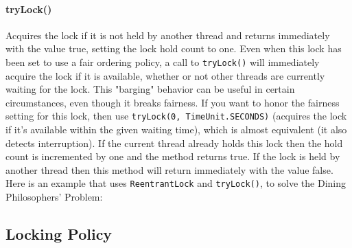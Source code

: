 \documentclass{article}
\begin{document}
\paragraph{tryLock()} Acquires the lock if it is not held by another thread and returns immediately with the value true, setting the lock hold count to one. Even when this lock has been set to use a fair ordering policy, a call to \lstinline{tryLock()} will immediately acquire the lock if it is available, whether or not other threads are currently waiting for the lock. This "barging" behavior can be useful in certain circumstances, even though it breaks fairness. If you want to honor the fairness setting for this lock, then use \lstinline{tryLock(0, TimeUnit.SECONDS)} (acquires the lock if it's available within the given waiting time), which is almost equivalent (it also detects interruption). If the current thread already holds this lock then the hold count is incremented by one and the method returns true. If the lock is held by another thread then this method will return immediately with the value false. Here is an example that uses \lstinline{ReentrantLock} and \lstinline{tryLock()}, to solve the Dining Philosophers' Problem:



\subsection{Locking Policy}
\end{document}

